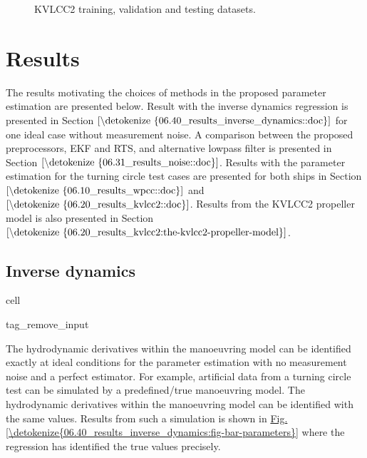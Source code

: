 \documentclass[review]{elsarticle}
\begin{document}
\begin{figure}[H]
\centering
\capstart

\noindent{}
\caption{KVLCC2 training, validation and testing datasets.}\label{\detokenize{05.01_case_studies:fig-kvlcc2-traintest}}\end{figure}


\section{Results}
\label{\detokenize{06.01_results:results}}\label{\detokenize{06.01_results:id1}}\label{\detokenize{06.01_results::doc}}
\sphinxAtStartPar
The results motivating the choices of methods in the proposed parameter estimation are presented below. Result with the inverse dynamics regression is presented in Section \(\ref{\detokenize{06.40_results_inverse_dynamics::doc}}\) for one ideal case without measurement noise. A comparison between the proposed preprocessors, EKF and RTS, and alternative low\sphinxhyphen{}pass filter is presented in Section \(\ref{\detokenize{06.31_results_noise::doc}}\). Results with the parameter estimation for the turning circle test cases are presented for both ships in Section \(\ref{\detokenize{06.10_results_wpcc::doc}}\) and \(\ref{\detokenize{06.20_results_kvlcc2::doc}}\). Results from the KVLCC2 propeller model is also presented in Section  \(\ref{\detokenize{06.20_results_kvlcc2:the-kvlcc2-propeller-model}}\).


\subsection{Inverse dynamics}
\label{\detokenize{06.40_results_inverse_dynamics:inverse-dynamics}}\label{\detokenize{06.40_results_inverse_dynamics::doc}}
\begin{sphinxuseclass}{cell}
\begin{sphinxuseclass}{tag_remove_input}
\end{sphinxuseclass}
\end{sphinxuseclass}
\sphinxAtStartPar
The hydrodynamic derivatives within the manoeuvring model can be identified exactly at ideal conditions for the parameter estimation with no measurement noise and a perfect estimator. For example, artificial data from a turning circle test can be simulated by a pre\sphinxhyphen{}defined/true manoeuvring model. The hydrodynamic derivatives within the manoeuvring model can be identified with the same values. Results from such a simulation is shown in \hyperref[\detokenize{06.40_results_inverse_dynamics:fig-bar-parameters}]{Fig.\@ \ref{\detokenize{06.40_results_inverse_dynamics:fig-bar-parameters}}} where the regression has identified the true values precisely.
\end{document}
